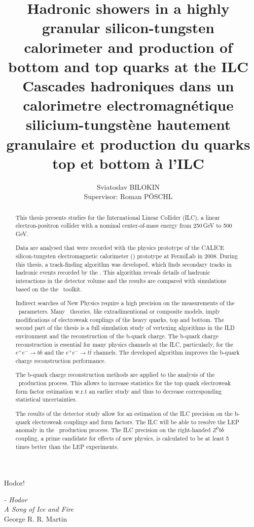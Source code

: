\documentclass[a4paper, 12pt]{article}
\title{Hadronic showers in a highly granular silicon-tungsten calorimeter and production of bottom and top quarks at the ILC \\ Cascades hadroniques dans un calorimetre electromagn\'etique silicium-tungst\`ene hautement granulaire et production du quarks top et bottom \`a l'ILC}
\author{Sviatoslav BILOKIN\\Supervisor:  Roman P\"OSCHL}
\begin{document}
	
	\epigraph{Hodor!}{\textit{ - Hodor \\ A Song of Ice and Fire} \\George R. R. Martin}	\newpage
	
	\newpage
%

\renewcommand{\abstractname}{Abstract}
\begin{abstract}

This thesis presents studies for the International Linear Collider (ILC), a linear electron-positron collider with a nominal center-of-mass energy from 250\,GeV to 500\,GeV.

Data are analysed that were recorded with the physics prototype of the CALICE silicon-tungsten electromagnetic calorimeter (\ecal) prototype at FermiLab in 2008. During this thesis, a track-finding algorithm was developed, which finds secondary tracks in hadronic events recorded by the \ecalp. This algorithm reveals details of hadronic interactions in the detector volume and the results are compared with simulations based on the the \geant\ toolkit.

Indirect searches of New Physics require a high precision on the measurements of the \sm\ parameters. 
Many \bsm\ theories, like extradimentional or composite models, imply modifications of electroweak couplings of the heavy quarks, top and bottom. The second part of the thesis is a full simulation study of vertexing algorithms in the ILD environment and the reconstruction of the b-quark charge. The b-quark charge reconstruction is essential for many physics channels at the ILC, particularly, for the $e^+e^-\to b\bar{b}$ and the $e^+e^-\to t\bar{t}$ channels.
The developed algorithm improves the b-quark charge reconstruction performance.

The b-quark charge reconstruction methods are applied to the analysis of the \ttbar\ production process. This allows to increase statistics for the top quark electroweak form factor estimation w.r.t an earlier study and thus to decrease corresponding statistical uncertainties.

The results of the detector study allow for an estimation of the ILC precision on the b-quark electroweak couplings and form factors. The ILC will be able to resolve the LEP anomaly in the \bbbar\ production process. The ILC precision on the right-handed $Z^0b\bar{b}$ coupling, a prime candidate for effects of new physics, is calculated to be at least 5 times better than the LEP experiments. 
\end{abstract}
\end{document}
